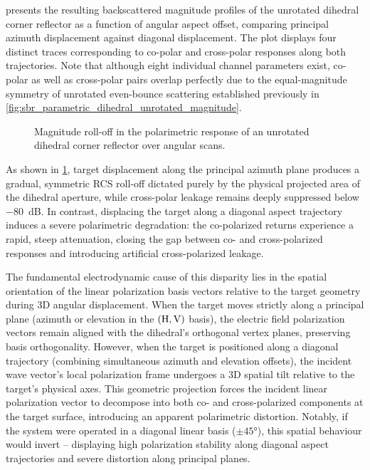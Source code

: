  presents the resulting backscattered magnitude profiles of the unrotated dihedral corner reflector as a function of angular aspect offset, comparing principal azimuth displacement against diagonal displacement.
The plot displays four distinct traces corresponding to co-polar and cross-polar responses along both trajectories.
Note that although eight individual channel parameters exist, co-polar as well as cross-polar pairs overlap perfectly due to the equal-magnitude symmetry of unrotated even-bounce scattering established previously in \cref{fig:sbr_parametric_dihedral_unrotated_magnitude}.

\begin{figure}
    \centering
    
    \caption{Magnitude roll-off in the polarimetric response of an unrotated dihedral corner reflector over angular scans.}
    \label{fig:sbr_parametric_dihedral_angular_scan}
\end{figure}

As shown in \cref{fig:sbr_parametric_dihedral_angular_scan}, target displacement along the principal azimuth plane produces a gradual, symmetric RCS roll-off dictated purely by the physical projected area of the dihedral aperture, while cross-polar leakage remains deeply suppressed below \qty{-80}{\dB}.
In contrast, displacing the target along a diagonal aspect trajectory induces a severe polarimetric degradation: the co-polarized returns experience a rapid, steep attenuation, closing the gap between co- and cross-polarized responses and introducing artificial cross-polarized leakage.

The fundamental electrodynamic cause of this disparity lies in the spatial orientation of the linear polarization basis vectors relative to the target geometry during 3D angular displacement.
When the target moves strictly along a principal plane (azimuth or elevation in the $(\mathrm{H}, \mathrm{V})$ basis), the electric field polarization vectors remain aligned with the dihedral's orthogonal vertex planes, preserving basis orthogonality.
However, when the target is positioned along a diagonal trajectory (combining simultaneous azimuth and elevation offsets), the incident wave vector's local polarization frame undergoes a 3D spatial tilt relative to the target's physical axes.
This geometric projection forces the incident linear polarization vector to decompose into both co- and cross-polarized components at the target surface, introducing an apparent polarimetric distortion.
Notably, if the system were operated in a diagonal linear basis ($\pm \ang{45}$), this spatial behaviour would invert -- displaying high polarization stability along diagonal aspect trajectories and severe distortion along principal planes.

